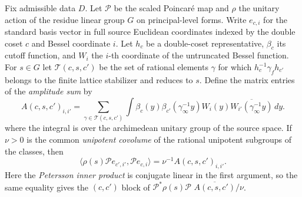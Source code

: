 \begin{lemma}
\label{lem:b-amplitude-blocks}
\emitthmsource
Fix admissible data $D$. Let $\mathcal P$ be the scaled
Poincaré map and $\rho$ the unitary action of the residue linear group $G$ on principal-level forms.
Write $e_{c,i}$ for the standard basis vector in full source Euclidean coordinates indexed by the double coset $c$ and Bessel coordinate $i$.
Let $h_c$ be a double-coset representative, $\beta_c$ its cutoff function, and $W_i$ the
$i$-th coordinate of the untruncated Bessel function. For $s\in G$ let $\mathcal T(c,s,c')$ be the set of
rational elements $\gamma$ for which $h_c^{-1}\gamma_f h_{c'}$ belongs to the finite lattice stabilizer and reduces to $s$.
Define the matrix entries of the \emph{amplitude sum} by
\[
 A(c,s,c')_{i,i'}
 =\sum_{\gamma\in\mathcal T(c,s,c')}\!
   \int \beta_c(y)\beta_{c'}(\gamma_\infty^{-1}y)
     W_i(y)\overline{W_{i'}(\gamma_\infty^{-1}y)}\,dy .
\]
where the integral is over the archimedean unitary group of the source space. If $\nu>0$ is the common \emph{unipotent covolume} of the rational unipotent subgroups of the classes, then
\[
 \langle \rho(s)\mathcal P e_{c',i'},\mathcal P e_{c,i}\rangle
 =\nu^{-1} A(c,s,c')_{i,i'} .
\]
Here the \emph{Petersson inner product} is conjugate linear in the first argument, so the same equality gives the
$(c,c')$ block of $\mathcal P^*\rho(s)\mathcal P$
$\overline{A(c,s,c')}/\nu$.
\end{lemma}
